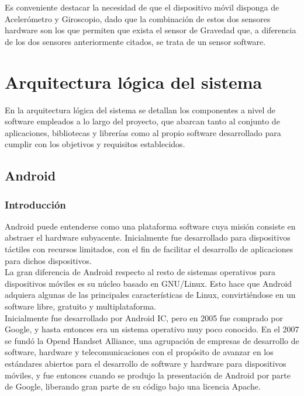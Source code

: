 Es conveniente destacar la necesidad de que el dispositivo móvil disponga de Acelerómetro y Giroscopio, dado que la combinación de estos dos sensores hardware son los que permiten que exista el sensor de Gravedad que, a diferencia de los dos sensores anteriormente citados, se trata de un sensor software.

\section{Arquitectura lógica del sistema}

En la arquitectura lógica del sistema se detallan los componentes a nivel de software empleados a lo largo del proyecto, que abarcan tanto al conjunto de aplicaciones, bibliotecas y librerías como al propio software desarrollado para cumplir con los objetivos y requisitos establecidos.

\subsection{Android}

\subsubsection{Introducción}

Android \cite{website:android} puede entenderse como una plataforma software cuya misión consiste en abstraer el hardware subyacente. Inicialmente fue desarrollado para dispositivos táctiles con recursos limitados, con el fin de facilitar el desarrollo de aplicaciones para dichos dispositivos.\\

La gran diferencia de Android respecto al resto de sistemas operativos para dispositivos móviles es su núcleo basado en GNU/Linux. Esto hace que Android adquiera algunas de las principales características de Linux, convirtiéndose en un software libre, gratuito y multiplataforma. \\

Inicialmente fue desarrollado por Android IC, pero en 2005 fue comprado por Google, y hasta entonces era un sistema operativo muy poco conocido. En el 2007 se fundó la Opend Handset Alliance, una agrupación de empresas de desarrollo de software, hardware y telecomunicaciones con el propósito de avanzar en los estándares abiertos para el desarrollo de software y hardware para dispositivos móviles, y fue entonces cuando se produjo la presentación de Android por parte de Google, liberando gran parte de su código bajo una licencia Apache.\\

